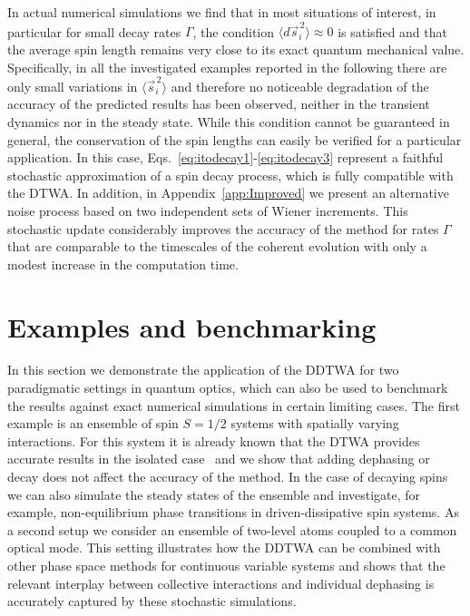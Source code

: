 \documentclass[pra,twocolumn,showpacs,preprintnumbers,amsmath,amssymb,superscriptaddress]{revtex4-1}
\newcommand{\erw}[1]{\langle#1\rangle}
\begin{document}
In actual numerical simulations we find that in most situations of interest, in particular for small decay rates $\Gamma$, the condition $ \langle d \vec s^{\,2}_i \rangle\approx 0$ is satisfied and that the average spin length remains very close to its exact quantum mechanical value.  Specifically, in all the investigated examples reported in the following there are only  small variations in $\erw{\vec s_i^{\,2}}$ and therefore no noticeable degradation of the accuracy of the predicted results has been observed, neither in the transient dynamics nor in the steady state. While this condition cannot be guaranteed in general, the conservation of the spin lengths can easily be verified for a particular application. In this case, Eqs.~\eqref{eq:itodecay1}-\eqref{eq:itodecay3} represent a faithful stochastic approximation of a spin decay process, which is fully compatible with the DTWA. In addition, in Appendix~\ref{app:Improved} we present an alternative noise process based on two independent sets of Wiener increments. This stochastic update considerably improves the accuracy of the method for rates $\Gamma$ that are comparable to the timescales of the coherent evolution with only a modest increase in the computation time.



\section{Examples and benchmarking}\label{sec:examples}
In this section we demonstrate the application of the DDTWA for two paradigmatic settings in quantum optics, which can also be used to benchmark the results against exact numerical simulations in certain limiting cases. The first example is an ensemble of spin $S=1/2$ systems with spatially varying interactions. For this system it is already known that the DTWA provides accurate results in the isolated case~\cite{Schachenmayer2015} and we show that adding dephasing or decay does not affect the accuracy of the method. In the case of decaying spins we can also simulate the steady states of the ensemble and investigate, for example, non-equilibrium phase transitions in driven-dissipative spin systems. As a second setup we consider an ensemble of two-level atoms coupled to a common optical mode. This setting illustrates how the DDTWA can be combined with other phase space methods for continuous variable systems and shows that the relevant interplay between collective interactions and individual dephasing is accurately captured by these stochastic simulations.
\end{document}
